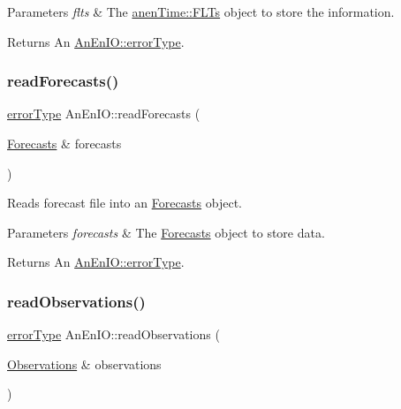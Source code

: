 \begin{DoxyParams}{Parameters}
{\em flts} & The \mbox{\hyperlink{classanen_time_1_1_f_l_ts}{anen\+Time\+::\+F\+L\+Ts}} object to store the information. \\
\hline
\end{DoxyParams}
\begin{DoxyReturn}{Returns}
An \mbox{\hyperlink{class_an_en_i_o_aa56bc1ec6610b86db4349bce20f9ead0}{An\+En\+I\+O\+::error\+Type}}. 
\end{DoxyReturn}
\mbox{\label{class_an_en_i_o_a912e513e58fa258e1dce67ff161abab2}} 
\subsubsection{\texorpdfstring{read\+Forecasts()}{readForecasts()}}
{\footnotesize\ttfamily \mbox{\hyperlink{class_an_en_i_o_aa56bc1ec6610b86db4349bce20f9ead0}{error\+Type}} An\+En\+I\+O\+::read\+Forecasts (\begin{DoxyParamCaption}\item[{\mbox{\hyperlink{class_forecasts}{Forecasts}} \&}]{forecasts }\end{DoxyParamCaption})}

Reads forecast file into an \mbox{\hyperlink{class_forecasts}{Forecasts}} object.


\begin{DoxyParams}{Parameters}
{\em forecasts} & The \mbox{\hyperlink{class_forecasts}{Forecasts}} object to store data. \\
\hline
\end{DoxyParams}
\begin{DoxyReturn}{Returns}
An \mbox{\hyperlink{class_an_en_i_o_aa56bc1ec6610b86db4349bce20f9ead0}{An\+En\+I\+O\+::error\+Type}}. 
\end{DoxyReturn}
\mbox{\label{class_an_en_i_o_a41ebcc0c9edee123626bf6e606917a49}} 
\subsubsection{\texorpdfstring{read\+Observations()}{readObservations()}}
{\footnotesize\ttfamily \mbox{\hyperlink{class_an_en_i_o_aa56bc1ec6610b86db4349bce20f9ead0}{error\+Type}} An\+En\+I\+O\+::read\+Observations (\begin{DoxyParamCaption}\item[{\mbox{\hyperlink{class_observations}{Observations}} \&}]{observations }\end{DoxyParamCaption})}

